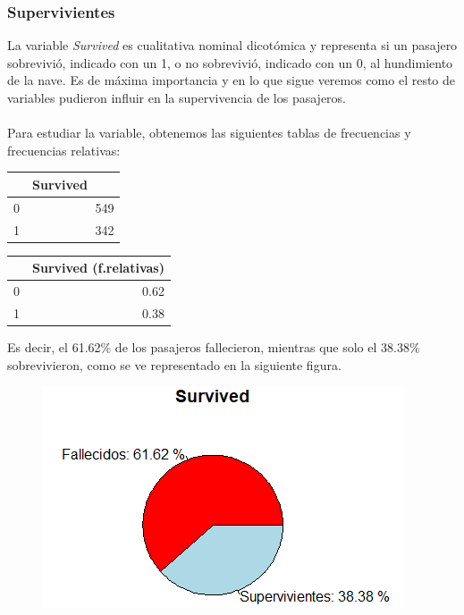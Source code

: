 \documentclass{article}
\begin{document}
\subsubsection{Supervivientes}
La variable \textit{Survived} es cualitativa nominal dicotómica y representa si un pasajero sobrevivió, indicado con un 1, o no sobrevivió, indicado con un 0, al hundimiento de la nave. Es de máxima importancia y en lo que sigue veremos como el resto de variables pudieron influir en la supervivencia de los pasajeros.\\\\
Para estudiar la variable, obtenemos las siguientes tablas de frecuencias y frecuencias relativas:
\begin{table}[htbp]
    \centering
    \begin{minipage}{.5\textwidth}
        \centering
        \begin{tabular}{rr}
            \hline
             & Survived \ \ \ \\ 
             \hline
            0 & 549 \\ 
            1 & 342 \\ 
            \hline
        \end{tabular}
    \end{minipage}%
    \begin{minipage}{.5\textwidth}
        \centering
        \begin{tabular}{rr}
            \hline
            & Survived (f.relativas) \\ 
            \hline
            0 & 0.62 \\ 
            1 & 0.38 \\ 
            \hline
        \end{tabular}
    \end{minipage}
\end{table}

\noindent Es decir, el 61.62\% de los pasajeros fallecieron, mientras que solo el 38.38\% sobrevivieron, como se ve representado en la siguiente figura.
\begin{figure}[!h]
    \centering
    \includegraphics[width=0.5\linewidth]{content/pie_survived.png}
\end{figure}
\end{document}
